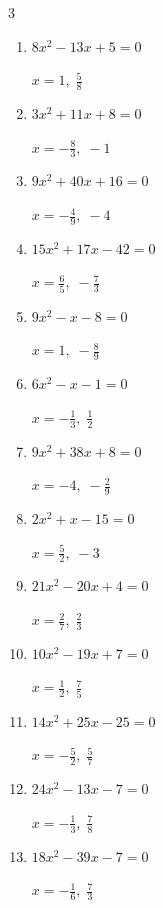\begin{multicols}{3}
\begin{enumerate}
  \item $8x^{2}-13x+5=0$

        $\displaystyle x=1,\; \frac{5}{8}$

  \item $3x^{2}+11x+8=0$

        $\displaystyle x=-\frac{8}{3},\; -1$

  \item $9x^{2}+40x+16=0$

        $\displaystyle x=-\frac{4}{9},\; -4$

  \item $15x^{2}+17x-42=0$

        $\displaystyle x=\frac{6}{5},\; -\frac{7}{3}$

  \item $9x^{2}-x-8=0$

        $\displaystyle x=1,\; -\frac{8}{9}$

  \item $6x^{2}-x-1=0$

        $\displaystyle x=-\frac{1}{3},\; \frac{1}{2}$

  \item $9x^{2}+38x+8=0$

        $\displaystyle x=-4,\; -\frac{2}{9}$

  \item $2x^{2}+x-15=0$

        $\displaystyle x=\frac{5}{2},\; -3$

  \item $21x^{2}-20x+4=0$

        $\displaystyle x=\frac{2}{7},\; \frac{2}{3}$

  \item $10x^{2}-19x+7=0$

        $\displaystyle x=\frac{1}{2},\; \frac{7}{5}$

\columnbreak %

  \item $14x^{2}+25x-25=0$

        $\displaystyle x=-\frac{5}{2},\; \frac{5}{7}$

  \item $24x^{2}-13x-7=0$

        $\displaystyle x=-\frac{1}{3},\; \frac{7}{8}$

  \item $18x^{2}-39x-7=0$

        $\displaystyle x=-\frac{1}{6},\; \frac{7}{3}$


\end{enumerate}
\end{multicols}
